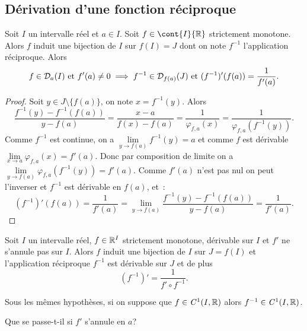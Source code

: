 \subsection{Dérivation d'une fonction réciproque}

\begin{theo}
  Soit $I$ un intervalle réel et $a \in I$. Soit $f \in \cont{I}{\R}$ strictement monotone. Alors $f$ induit une bijection de $I$ sur $f(I)=J$ dont on note $f^{-1}$ l'application réciproque. Alors
  \begin{equation}
    f \in \mathcal{D}_{a}(I) \text{~et~} f'(a) \neq 0 \implies f^{-1} \in \mathcal{D}_{f(a)}(J) \text{~et~} (f^{-1})'(f(a))=\frac{1}{f'(a)}.
  \end{equation}
\end{theo}
\begin{proof}
  Soit $y \in J \setminus \{f(a)\}$, on note $x=f^{-1}(y)$. Alors
  \begin{equation}
    \frac{f^{-1}(y)-f^{-1}(f(a))}{y-f(a)}=\frac{x-a}{f(x)-f(a)} = \frac{1}{\varphi_{f,a}(x)}=\frac{1}{\varphi_{f,a}(f^{-1}(y))}.
  \end{equation}
  Comme $f^{-1}$ est continue, on a $\lim\limits_{y \to f(a)}f^{-1}(y) = a$ et comme $f$ est dérivable $\lim\limits_{x \to a} \varphi_{f,a}(x)=f'(a)$. Donc par composition de limite on a $\lim\limits_{y \to f(a)}\varphi_{f,a}(f^{-1}(y))=f'(a)$. Comme $f'(a)$ n'est pas nul on peut l'inverser et $f^{-1}$ est dérivable en $f(a)$, et~:
  \begin{equation}
    (f^{-1})'(f(a))=\frac{1}{f'(a)} = \lim\limits_{y \to f(a)} \frac{f^{-1}(y)-f^{-1}(f(a))}{y-f(a)} = \frac{1}{f'(a)}.
  \end{equation}
\end{proof}
\begin{corth}
  Soit $I$ un intervalle réel, $f \in \mathbb{R}^I$ strictement monotone, dérivable sur $I$ et $f'$ ne s'annule pas sur $I$. Alors $f$ induit une bijection de $I$ sur $J=f(I)$ et l'application réciproque $f^{-1}$ est dérivable sur $J$ et de plus
  \begin{equation}
    (f^{-1})'=\frac{1}{f' \circ f^{-1}}.
  \end{equation}
\end{corth}
\begin{corth}
  Sous les mêmes hypothèses, si on suppose que $f \in \mathit{C}^1(I,\mathbb{R})$ alors $f^{-1} \in \mathit{C}^1(I,\mathbb{R})$.
\end{corth}

Que se passe-t-il si $f'$ s'annule en $a$?

